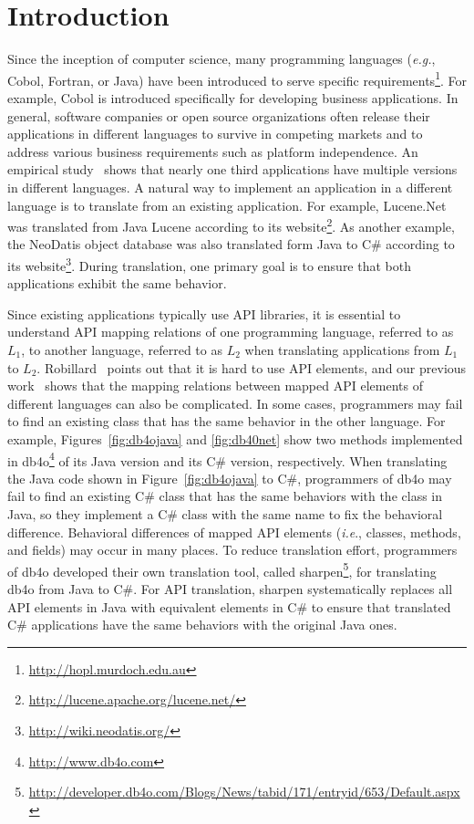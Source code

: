 \section{Introduction}
\label{sec:introduction}

Since the inception of computer science, many programming languages (\emph{e.g.}, Cobol, Fortran, or Java) have been introduced to serve specific requirements\footnote{\url{http://hopl.murdoch.edu.au}}. For example, Cobol is introduced specifically for developing business applications. In general, software companies or open source organizations often release their applications in different languages to survive in competing markets and to address various business requirements such as platform independence. An empirical study~\cite{jones1998estimating} shows that nearly one third applications have multiple versions in different languages. A natural way to implement an application in a different language is to translate from an existing application. For example, Lucene.Net was translated from Java Lucene according to its website\footnote{\url{http://lucene.apache.org/lucene.net/}}. As another example, the NeoDatis object database was also translated form Java to C\# according to its website\footnote{\url{http://wiki.neodatis.org/}}. During translation, one primary goal is to ensure that both applications exhibit the same behavior.

Since existing applications typically use API libraries, it is essential to understand API mapping relations of one programming language, referred to as $L_1$, to another language, referred to as $L_2$ when translating applications from $L_1$ to $L_2$. Robillard~\cite{robillard2009makes} points out that it is hard to use API elements, and our previous work~\cite{zhong2010mining} shows that the mapping relations between mapped API elements of different languages can also be complicated. In some cases, programmers may fail to find an existing class that has the same behavior in the other language. For example, Figures~\ref{fig:db4ojava} and \ref{fig:db40net} show two methods implemented in db4o\footnote{\url{http://www.db4o.com}} of its Java version and its C\# version, respectively. When translating the Java code shown in Figure~\ref{fig:db4ojava} to C\#, programmers of db4o may fail to find an existing C\# class that has the same behaviors with the  class in Java, so they implement a C\# class with the same name to fix the behavioral difference. Behavioral differences of mapped API elements (\emph{i.e}., classes, methods, and fields) may occur in many places. To reduce translation effort, programmers of db4o developed their own translation tool, called sharpen\footnote{\url{http://developer.db4o.com/Blogs/News/tabid/171/entryid/653/Default.aspx}}, for translating db4o from Java to C\#. For API translation, sharpen systematically replaces all API elements in Java with equivalent elements in C\# to ensure that translated C\# applications have the same behaviors with the original Java ones.

